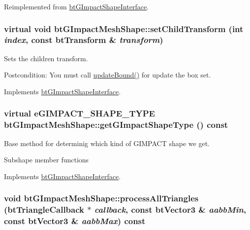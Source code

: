 Reimplemented from \hyperlink{classbt_g_impact_shape_interface_dec0bd43cd0105b1d0dc172bc7db50d8}{btGImpactShapeInterface}.\hypertarget{classbt_g_impact_mesh_shape_274feed3c9a38a6af5c9f1141ae9ac1a}{
\subsubsection[setChildTransform]{\setlength{\rightskip}{0pt plus 5cm}virtual void btGImpactMeshShape::setChildTransform (int {\em index}, \/  const btTransform \& {\em transform})}}
\label{classbt_g_impact_mesh_shape_274feed3c9a38a6af5c9f1141ae9ac1a}


Sets the children transform. 

\begin{Desc}
\item[Postcondition:]You must call \hyperlink{classbt_g_impact_shape_interface_cb26c2d7a2aecabd06b996b72b848492}{updateBound()} for update the box set. \end{Desc}


Implements \hyperlink{classbt_g_impact_shape_interface_83392f97bd7dfeb71ccdce6913a465b0}{btGImpactShapeInterface}.\hypertarget{classbt_g_impact_mesh_shape_cd958461b4f7802e5bceed2db87c4ff0}{
\subsubsection[getGImpactShapeType]{\setlength{\rightskip}{0pt plus 5cm}virtual eGIMPACT\_\-SHAPE\_\-TYPE btGImpactMeshShape::getGImpactShapeType () const}}
\label{classbt_g_impact_mesh_shape_cd958461b4f7802e5bceed2db87c4ff0}


Base method for determinig which kind of GIMPACT shape we get. 

Subshape member functions 

Implements \hyperlink{classbt_g_impact_shape_interface_25cacbe448997e3f8ec99cb2d4952859}{btGImpactShapeInterface}.\hypertarget{classbt_g_impact_mesh_shape_0b3a0f7b06feb5e2e1fa94f2b5fcd4c7}{
\subsubsection[processAllTriangles]{\setlength{\rightskip}{0pt plus 5cm}void btGImpactMeshShape::processAllTriangles ({\bf btTriangleCallback} $\ast$ {\em callback}, \/  const btVector3 \& {\em aabbMin}, \/  const btVector3 \& {\em aabbMax}) const}}
\label{classbt_g_impact_mesh_shape_0b3a0f7b06feb5e2e1fa94f2b5fcd4c7}


